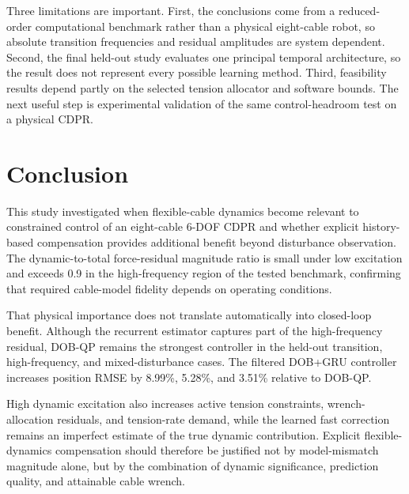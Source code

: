 \documentclass[conference]{IEEEtran}
\begin{document}
Three limitations are important. First, the conclusions come from a reduced-order computational benchmark rather than a physical eight-cable robot, so absolute transition frequencies and residual amplitudes are system dependent. Second, the final held-out study evaluates one principal temporal architecture, so the result does not represent every possible learning method. Third, feasibility results depend partly on the selected tension allocator and software bounds. The next useful step is experimental validation of the same control-headroom test on a physical CDPR.

\section{Conclusion}
This study investigated when flexible-cable dynamics become relevant to constrained control of an eight-cable 6-DOF CDPR and whether explicit history-based compensation provides additional benefit beyond disturbance observation. The dynamic-to-total force-residual magnitude ratio is small under low excitation and exceeds 0.9 in the high-frequency region of the tested benchmark, confirming that required cable-model fidelity depends on operating conditions.

That physical importance does not translate automatically into closed-loop benefit. Although the recurrent estimator captures part of the high-frequency residual, DOB-QP remains the strongest controller in the held-out transition, high-frequency, and mixed-disturbance cases. The filtered DOB+GRU controller increases position RMSE by 8.99\%, 5.28\%, and 3.51\% relative to DOB-QP.

High dynamic excitation also increases active tension constraints, wrench-allocation residuals, and tension-rate demand, while the learned fast correction remains an imperfect estimate of the true dynamic contribution. Explicit flexible-dynamics compensation should therefore be justified not by model-mismatch magnitude alone, but by the combination of dynamic significance, prediction quality, and attainable cable wrench.
\end{document}
